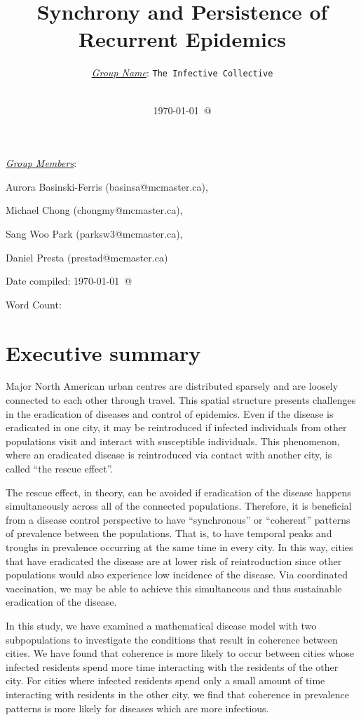 \documentclass[12pt]{article}
\title{Synchrony and Persistence of Recurrent Epidemics}
\author{ \underline{\emph{Group Name}}: \texttt{{\color{blue}The Infective Collective}}\\
\\}
\date{\today\ @ \thistime}
\begin{document}
\vfill
\maketitle 
\noindent

\underline{\emph{Group Members}}:
\begin{itemize}
{\color{blue}
\item Aurora Basinski-Ferris (basinsa@mcmaster.ca), 
\item Michael Chong (chongmy@mcmaster.ca), 
\item Sang Woo Park (parksw3@mcmaster.ca), 
\item Daniel Presta (prestad@mcmaster.ca)}
\end{itemize}
\noindent 
Date compiled: \today\ @ \thistime 

\noindent
Word Count: 

\vfill
\newpage 
\linenumbers

\section*{Executive summary}
Major North American urban centres are distributed sparsely and are loosely connected to each other through travel. This spatial structure presents challenges in the eradication of diseases and control of epidemics. Even if the disease is eradicated in one city, it may be reintroduced if infected individuals from other populations visit and interact with susceptible individuals. This phenomenon, where an eradicated disease is reintroduced via contact with another city, is called “the rescue effect”.

The rescue effect, in theory, can be avoided if eradication of the disease happens simultaneously across all of the connected populations. Therefore, it is beneficial from a disease control perspective to have “synchronous” or “coherent” patterns of prevalence between the populations. That is, to have temporal peaks and troughs in prevalence occurring at the same time in every city. In this way, cities that have eradicated the disease are at lower risk of reintroduction since other populations would also experience low incidence of the disease. Via coordinated vaccination, we may be able to achieve this simultaneous and thus sustainable eradication of the disease.

In this study, we have examined a mathematical disease model with two subpopulations to investigate the conditions that result in coherence between cities. We have found that coherence is more likely to occur between cities whose infected residents spend more time interacting with the residents of the other city. For cities where infected residents spend only a small amount of time interacting with residents in the other city, we find that coherence in prevalence patterns is more likely for diseases which are more infectious. 
\end{document}
